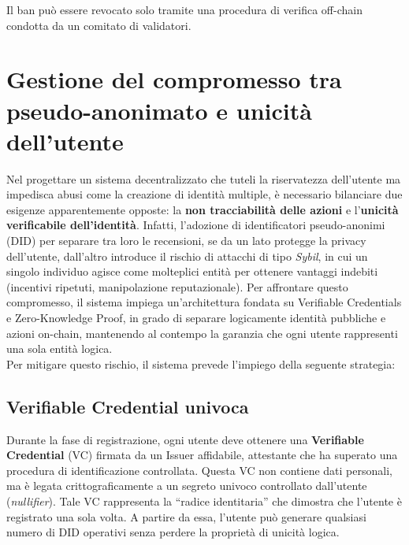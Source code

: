             \noindent Il ban può essere revocato solo tramite una procedura di verifica off-chain condotta da un comitato di validatori.
    
    \section{Gestione del compromesso tra pseudo-anonimato e unicità dell'utente}
        Nel progettare un sistema decentralizzato che tuteli la riservatezza dell'utente ma impedisca abusi come la creazione di identità multiple, è necessario bilanciare due esigenze apparentemente opposte: la \textbf{non tracciabilità delle azioni} e l'\textbf{unicità verificabile dell'identità}. Infatti, l'adozione di identificatori pseudo-anonimi (DID) per separare tra loro le recensioni, se da un lato protegge la privacy dell'utente, dall'altro introduce il rischio di attacchi di tipo \textit{Sybil}, in cui un singolo individuo agisce come molteplici entità per ottenere vantaggi indebiti (incentivi ripetuti, manipolazione reputazionale).
        Per affrontare questo compromesso, il sistema impiega un'architettura fondata su Verifiable Credentials e Zero-Knowledge Proof, in grado di separare logicamente identità pubbliche e azioni on-chain, mantenendo al contempo la garanzia che ogni utente rappresenti una sola entità logica. \\
        Per mitigare questo rischio, il sistema prevede l'impiego della seguente strategia:
        
        \subsection{Verifiable Credential univoca}
            Durante la fase di registrazione, ogni utente deve ottenere una \textbf{Verifiable Credential} (VC) firmata da un Issuer affidabile, attestante che ha superato una procedura di identificazione controllata. Questa VC non contiene dati personali, ma è legata crittograficamente a un segreto univoco controllato dall'utente (\textit{nullifier}). Tale VC rappresenta la “radice identitaria” che dimostra che l'utente è registrato una sola volta. A partire da essa, l'utente può generare qualsiasi numero di DID operativi senza perdere la proprietà di unicità logica.

